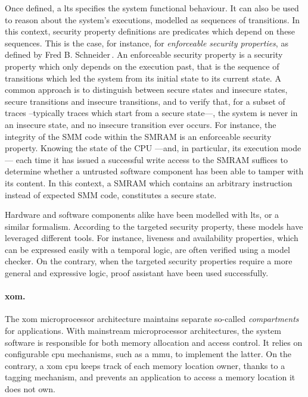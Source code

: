 Once defined, a \ac{lts} specifies the system functional behaviour.
%
It can also be used to reason about the system's executions, modelled as
sequences of transitions.
%
In this context, security property definitions are predicates which depend on
these sequences.
%
This is the case, for instance, for \emph{enforceable security properties}, as
defined by Fred B. Schneider\,\cite{schneider2000enforceable}.
%
An enforceable security property is a security property which only depends on
the execution past, that is the sequence of transitions which led the system
from its initial state to its current state.
%
A common approach is to distinguish between secure states and insecure states,
secure transitions and insecure transitions, and to verify that, for a subset of
traces --typically traces which start from a secure state---, the system is
never in an insecure state, and no insecure transition ever occurs.
%
For instance, the integrity of the SMM code within the SMRAM is an enforceable
security property.
%
Knowing the state of the CPU ---and, in particular, its execution mode--- each
time it has issued a successful write access to the SMRAM suffices to determine
whether a untrusted software component has been able to tamper with its content.
%
In this context, a SMRAM which contains an arbitrary instruction instead of
expected SMM code, constitutes a secure state.

Hardware and software components alike have been modelled with \ac{lts}, or a
similar formalism.
%
According to the targeted security property, these models have leveraged
different tools.
%
For instance, liveness and availability properties, which can be expressed
easily with a temporal logic, are often verified using a model checker.
%
On the contrary, when the targeted security properties require a more general
and expressive logic, proof assistant have been used successfully.

\paragraph{\ac{xom}.}
%
The \ac{xom} microprocessor architecture maintains separate so-called
\emph{compartments} for applications.
%
With mainstream microprocessor architectures, the system software is responsible
for both memory allocation and access control.
%
It relies on configurable \ac{cpu} mechanisms, such as a \ac{mmu}, to implement
the latter.
%
On the contrary, a \ac{xom} \ac{cpu} keeps track of each memory location owner,
thanks to a tagging mechanism, and prevents an application to access a memory
location it does not own.

